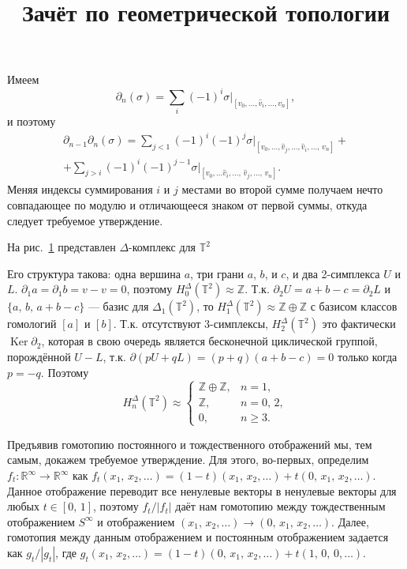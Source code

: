 \documentclass[a4paper]{article}
\title{Зачёт по геометрической топологии}
\begin{document}
	\maketitle
{}
\begin{sol}
Имеем 
\[
	\partial_n (\sigma)= \sum_{i}^{} (-1)^i \sigma|_{
	[v_0,\ldots,\hat{v}_i,\ldots,v_n]}
 ,\]
и поэтому
\begin{multline*}
	\partial_{n-1}\partial_{n}(\sigma)= \sum_{j<1}^{} (-1)^i
	(-1)^j \sigma|_{[v_0,\ldots,\hat{v}_j,\ldots,
	\hat{v}_i,\ldots,\,v_n]}+\\+
	\sum_{j>i}^{} (-1)^i (-1)^{j-1}\sigma|_{[v_0,\ldots
	\hat{v}_i,\ldots,\,\hat{v}_j,\ldots,\,v_n]}
.\end{multline*} 
Меняя индексы суммирования $i$ и $j$ местами во второй сумме
получаем нечто совпадающее по модулю и отличающееся знаком
от первой суммы, откуда следует требуемое утверждение.
\end{sol}
\begin{sol}
	На рис.~\ref{fig:1} представлен $\Delta$-комплекс для $\mathbb{T}^2$ 
\begin{figure}[ht]
    \centering
    \caption{}
    \label{fig:1}
\end{figure}
Его структура такова: одна вершина $a$, три грани $a$, $b$, и $c$,
и два 2-симплекса $U$ и $L$. $\partial_1 a=\partial_1 b=v-v=0$,
поэтому $H_0^\Delta(\mathbb{T}^2)\approx \mathbb{Z}$.  Т.\:к.
$\partial_2 U=a+b-c=\partial_2 L$ и $\{a,\,b,\,a+b-c\} $ ---
базис для $\Delta_1 (\mathbb{T}^2)$, то $H_1^\Delta(\mathbb{T}^2)
 \approx \mathbb{Z}\oplus \mathbb{Z}$ с базисом классов гомологий
 $[a]$ и $[b]$. Т.\:к. отсутствуют 3-симплексы, $H_2^\Delta(
 \mathbb{T}^2)$ это фактически $\operatorname{Ker} \partial_2$,
 которая в свою очередь является бесконечной циклической группой,
 порождённой $U-L$,  т.\:к. $\partial(pU+qL)=(p+q)(a+b-c)=0$ 
 только когда $p=-q$. Поэтому
 \[
	 H_n^\Delta(\mathbb{T}^2)\approx
	 \begin{cases}
		 \mathbb{Z}\oplus \mathbb{Z},& n=1,\\
		 \mathbb{Z},& n=0,\,2,\\
		 0,& n\ge 3.
	 \end{cases}
 \] 
\end{sol}
\begin{sol}
Предъявив гомотопию постоянного и тождественного
отображений мы, тем самым, докажем требуемое утверждение.
Для этого, во-первых, определим $f_t\colon  \mathbb{R}^\infty
\to \mathbb{R}^\infty$ как $f_t(x_1,\,x_2,\ldots)=(1-t)(x_1,\,
x_2,\ldots)+t(0,\,x_1,\,x_2,\ldots)$. Данное отображение переводит
все ненулевые векторы в ненулевые векторы для любых $t \in [0,\,1]$, поэтому $f_t /|f_t|$ даёт нам гомотопию между тождественным
отображением  $S^\infty$ и отображением $(x_1,\,x_2,\ldots)\to 
(0,\,x_1,\,x_2,\ldots)$. Далее, гомотопия между данным
отображением и постоянным отображением задается как $g_t /|g_t|$,
где $g_t(x_1,\,x_2,\ldots)=(1-t)(0,\,x_1,\,x_2,\ldots)+
t(1,\,0,\,0,\ldots)$.
\end{sol}
\end{document}
